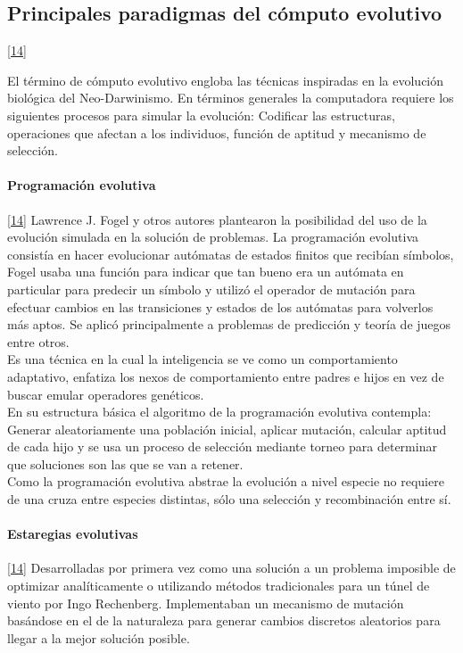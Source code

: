 		\subsection{Principales paradigmas del cómputo evolutivo}\ref{14}

		El término de cómputo evolutivo engloba las técnicas inspiradas en la evolución biológica del Neo-Darwinismo. En términos generales la computadora requiere los siguientes procesos para simular la evolución: Codificar las estructuras, operaciones que afectan a los individuos, función de aptitud y mecanismo de selección.\\

			\paragraph{Programación evolutiva}\ref{14}
			Lawrence J. Fogel y otros autores plantearon la posibilidad del uso de la evolución simulada en la solución de problemas. La programación evolutiva consistía en hacer evolucionar autómatas de estados finitos que recibían símbolos, Fogel usaba una función para indicar que tan bueno era un autómata en particular para predecir un símbolo y utilizó el operador de mutación para efectuar cambios en las transiciones y estados de los autómatas para volverlos más aptos. Se aplicó principalmente a problemas de predicción y teoría de juegos entre otros.\\

			Es una técnica en la cual la inteligencia se ve como un comportamiento adaptativo, enfatiza los nexos de comportamiento entre padres e hijos en vez de buscar  emular operadores genéticos.\\
			
			En su estructura básica el algoritmo de la programación evolutiva contempla: Generar aleatoriamente una población inicial, aplicar mutación, calcular aptitud de cada hijo y se usa un proceso de selección mediante torneo para determinar que soluciones son las que se van a retener.\\

			Como la programación evolutiva abstrae la evolución a nivel especie no requiere de una cruza entre especies distintas, sólo una selección y recombinación entre sí.\\


			\paragraph{Estaregias evolutivas} \ref{14}
			Desarrolladas por primera vez como una solución a un problema imposible de optimizar analíticamente o utilizando métodos tradicionales para un túnel de viento por Ingo Rechenberg. Implementaban un mecanismo de mutación basándose en el de la naturaleza para generar cambios discretos aleatorios para llegar a la mejor solución posible.\\

